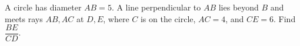 A circle has diameter $AB=5$. A line perpendicular to $AB$ lies beyond $B$ and meets rays $AB,AC$ at $D,E$, where $C$ is on the circle, $AC=4$, and $CE=6$. Find $\dfrac{BE}{CD}$.
